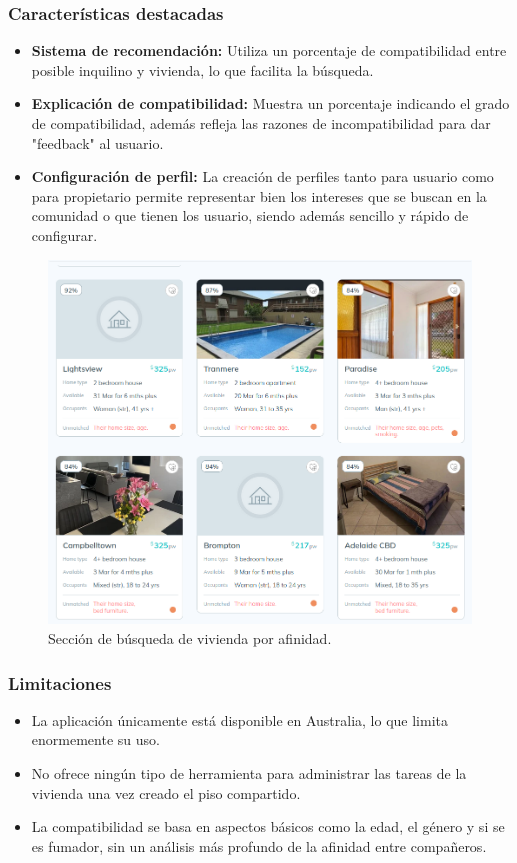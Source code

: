 \subsubsection*{Características destacadas}
\begin{itemize}
    \item  \textbf{Sistema de recomendación:} Utiliza un porcentaje de compatibilidad entre posible inquilino y vivienda, lo que facilita la búsqueda.
    \item \textbf{Explicación de compatibilidad:} Muestra un porcentaje indicando el grado de compatibilidad, además refleja las razones de incompatibilidad para dar "feedback" al usuario.
    \item \textbf{Configuración de perfil:} La creación de perfiles tanto para usuario como para propietario permite representar bien los intereses que se buscan en la comunidad o que tienen los usuario, siendo además sencillo y rápido de configurar. 
\end{itemize}
\begin{figure}[H]
    \centering
    \includegraphics[width=1\textwidth]{fotos/flatmate-matches.png}
    \caption{Sección de búsqueda de vivienda por afinidad\textbf{}.}
\end{figure}
\subsubsection*{Limitaciones}
\begin{itemize}
    \item La aplicación únicamente está disponible en Australia, lo que limita enormemente su uso.
    \item No ofrece ningún tipo de herramienta para administrar las tareas de la vivienda una vez creado el piso compartido.
    \item La compatibilidad se basa en aspectos básicos como la edad, el género y si se es fumador, sin un análisis más profundo de la afinidad entre compañeros.
\end{itemize}

